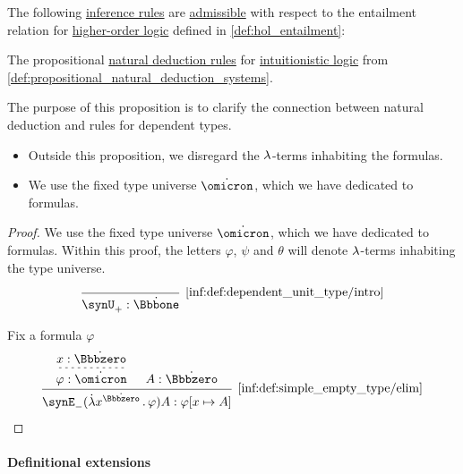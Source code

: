 \begin{proposition}\label{thm:hol_natural_deduction_rules}
  The following \hyperref[def:inference_rule]{inference rules} are \hyperref[con:inference_rule_admissibility]{admissible} with respect to the entailment relation for \hyperref[def:higher_order_logic]{higher-order logic} defined in \cref{def:hol_entailment}:
  \begin{thmenum}
     The propositional \hyperref[def:propositional_natural_deduction_systems]{natural deduction rules} for \hyperref[con:intuitionistic_logic]{intuitionistic logic} from \cref{def:propositional_natural_deduction_systems}.
  \end{thmenum}
\end{proposition}
\begin{comments}
  \item The purpose of this proposition is to clarify the connection between natural deduction and rules for dependent types.
  \begin{itemize}
    \item Outside this proposition, we disregard the \( {\mathrm \lambda} \)-terms inhabiting the formulas.
    \item We use the fixed type universe \( \syn\omicron \), which we have dedicated to formulas.
  \end{itemize}
\end{comments}
\begin{proof}
  We use the fixed type universe \( \syn\omicron \), which we have dedicated to formulas. Within this proof, the letters \( \varphi \), \( \psi \) and \( \theta \) will denote \( {\mathrm \lambda} \)-terms inhabiting the type universe.

  \begin{equation*}
    \begin{prooftree}
      \infer0[\ref{inf:def:dependent_unit_type/intro}]{ \synU_+: \syn\Bbbone }
    \end{prooftree}
  \end{equation*}

   Fix a formula \( \varphi \)
  \begin{equation*}
    \begin{prooftree}
      \hypo{ x: \syn\Bbbzero }
      \infer[dashed]1{ \varphi: \syn\omicron }

      \hypo{ A: \syn\Bbbzero }

      \infer2[\ref{inf:def:simple_empty_type/elim}]{ \synE_- (\qabs {x^{\syn\Bbbzero}} \varphi) A: \varphi[x \mapsto A] }
    \end{prooftree}
  \end{equation*}
\end{proof}

\paragraph{Definitional extensions}

\begin{definition}\label{def:hol_definitional_extension}\mimprovised
\end{definition}
